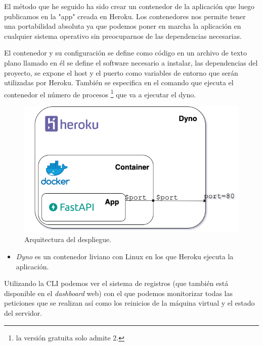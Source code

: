 El método que he seguido ha sido crear un contenedor de la aplicación que luego publicamos
en la "app" creada en Heroku. Los contenedores nos permite tener una portabilidad absoluta
ya que podemos poner en marcha la aplicación en cualquier sistema operativo sin
preocuparnos de las dependencias necesarias.

El contenedor y su configuración se define como código en un archivo de texto plano
llamado  en él se define el software necesario a instalar, las
dependencias del proyecto, se expone el host y el puerto como variables de entorno que
serán utilizadas por Heroku. También se especifica en el comando que ejecuta el contenedor
el número de procesos \footnote{la versión gratuita solo admite 2.} que va a ejecutar el
dyno. 

\FloatBarrier
\begin{figure}[h]
	\centering	
	\includegraphics[width=\textwidth]{doc/logos/imgs/deployd.png}
	\caption{ Arquitectura del despliegue. }
    \label{fig:arq-deploy}
\end{figure}
\FloatBarrier

\begin{itemize}
    \item \textit{Dyno} es un contenedor liviano con Linux en los que Heroku ejecuta la
    aplicación.
\end{itemize}

Utilizando la CLI podemos ver el sistema de registros (que también está disponible en el
\textit{dashboard} web) con el que podemos monitorizar todas las peticiones que se
realizan así como los reinicios de la máquina virtual y el estado del servidor.

